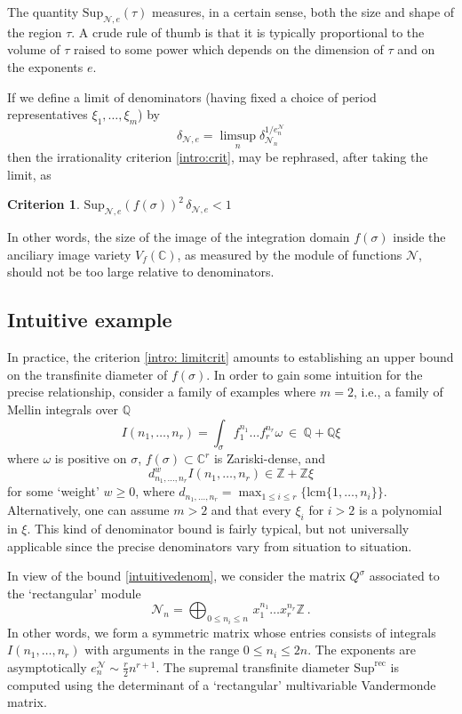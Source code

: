 \documentclass[a4paper,10pt]{amsart}
\theoremstyle{definition}
\newtheorem{crit}[thm]{Criterion}
\theoremstyle{remark}
\numberwithin{equation}{section}
\newcommand{\Z}{\mathbb Z}
\newcommand{\Q}{\mathbb Q}
\newcommand{\C}{\mathbb C}
\newcommand{\rec}{\mathrm{rec}}
\newcommand{\ts}{\mathrm{Sup}}
\newcommand{\0}{\color{blue}{\mathsf{0}}}
\begin{document}
  The quantity $\mathrm{Sup}_{\mathcal{N},e}(\tau)$ measures, in a certain sense, both the size and shape of the region $\tau$. A crude rule of thumb is that it is typically proportional to the volume of $\tau$ raised to some power which depends on the dimension of $\tau$ and on the exponents $e$. 
 
 
 If we define a limit of denominators (having fixed a choice of  period representatives $\xi_1,\ldots, \xi_m$) by 
 \begin{equation}  
 \delta_{\mathcal{N},e} = \limsup_n  \delta_{\mathcal{N}_n}^{1/e^{\mathcal{N}}_n}
 \end{equation} 
 then the irrationality criterion \ref{intro:crit}, may be rephrased,  after taking the limit, as
 \begin{crit}  \label{intro: limitcrit}
$
 \mathrm{Sup}_{\mathcal{N},e}(f (\sigma))^2 \,  \delta_{\mathcal{N},e} < 1 
 $ \end{crit}
 In other words, the size of the image of the integration domain $f(\sigma)$  inside the anciliary image variety $V_f(\C)$, as measured by the module of functions $\mathcal{N}$, should not be too large relative to denominators. 
   
 
\subsection{Intuitive example} \label{intro: exampleintuitive}  In practice, the criterion \eqref{intro: limitcrit} amounts to establishing an upper bound on the  transfinite diameter of $f(\sigma)$. 
In order to gain  some intuition for the precise relationship, consider a family of examples where $m=2$,  i.e., a family of Mellin integrals over $\Q$
\[  I(n_1,\ldots, n_r) = \int_{\sigma} f_1^{n_1} \ldots f_r^{n_r} \omega \  \in \  \Q + \Q \xi\]
where  $\omega$ is positive on $\sigma$,  $f(\sigma)\subset \C^r$ is Zariski-dense, and 
\begin{equation} \label{intuitivedenom}  d^w_{n_1,\ldots, n_r}  I(n_1,\ldots, n_r) \in \Z + \Z \xi
\end{equation} 
for some `weight' $w\geq 0$,   where $d_{n_1,\ldots, n_r} =  \max_{1\leq i \leq r}\{\mathrm{lcm} \{1,\ldots, n_i\}\}$.  Alternatively, one can assume $m>2$ and that every $\xi_i$ for $i>2$ is a polynomial in $\xi$. This kind of denominator bound is fairly typical,  but not universally applicable since  the precise denominators vary from situation to situation. 

In view of the  bound \eqref{intuitivedenom},  we consider the matrix $Q^{\sigma}$ associated to the `rectangular' module 
\[\mathcal{N}_n = \bigoplus_{0\leq n_i \leq n}\,  x_1^{n_1} \ldots x_r^{n_r} \Z \ . \] 
 In other words, we form a symmetric matrix whose entries consists of  integrals $I(n_1,\ldots, n_r)$ with arguments in the range $0 \leq n_i \leq 2n$.  The exponents are asymptotically  $e_n^{\mathcal{N}} \sim \frac{r}{2} n^{r+1}.$  The supremal transfinite diameter $\ts^{\rec}$ is computed using  the determinant of a `rectangular'  multivariable Vandermonde matrix. 
\end{document}
